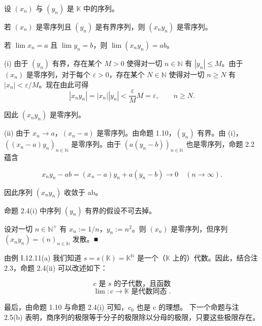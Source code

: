 \begin{proposition}

设 $ (x_{n}) $ 与 $ (y_{n}) $ 是 $ \mathbb{K} $ 中的序列。

\begin{subitems}
\item

若 $ (x_{n}) $ 是零序列且 $ (y_{n}) $ 是有界序列，则 $ (x_{n}y_{n}) $ 是零序列。

\item

若 $ \lim x_{n}=a $ 且 $ \lim y_{n}=b $，则 $ \lim(x_{n}y_{n})=ab $。

\proofhead
(i) 由于 $(y_n)$ 有界，存在某个 $M > 0$ 使得对一切 $n \in \mathbb{N}$ 有 $|y_n| \leq M$。由于 $(x_n)$ 是零序列，对于每个 $\varepsilon > 0$，存在某个 $N \in \mathbb{N}$ 使得对一切 $n \geq N$ 有 $|x_n| < \varepsilon/M$。现在由此可得
\[
|x_{n}y_{n}|=|x_{n}||y_{n}|<\frac{\varepsilon}{M}M=\varepsilon,\qquad n\geq N.
\]

因此 $(x_{n}y_{n})$ 是零序列。

\end{subitems}

(ii) 由于 $ x_n \to a $，$ (x_n - a) $ 是零序列。由命题 1.10，$ (y_n) $ 有界。由 (i)，$ ((x_n - a)y_n)_{n \in \mathbb{N}} $ 是零序列。由于 $ (a(y_n - b))_{n \in \mathbb{N}} $ 也是零序列，命题 2.2 蕴含

\[
x_{n}y_{n}-a b=(x_{n}-a)y_{n}+a(y_{n}-b)\to0\quad(n\to\infty).
\]

因此序列 $ (x_{n}y_{n}) $ 收敛于 ab。

\end{proposition}

\begin{remark}

\begin{items}
\item

命题 2.4(i) 中序列 $ (y_{n}) $ 有界的假设不可去掉。

\proofhead
设对一切 $ n \in \mathbb{N}^\times $ 有 $ x_n := 1/n $，$ y_n := n^2 $。则 $ (x_n) $ 是零序列，但序列 $ (x_ny_n) = (n)_{n \in \mathbb{N}} $ 发散。■
\item

由例 I.12.11(a) 我们知道 $ s = s(\mathbb{K}) = \mathbb{K}^{\mathbb{N}} $ 是一个（$ \mathbb{K} $ 上的）代数。因此，结合注 2.3，命题 2.4(ii) 可以改述如下：

\[
c\text{ 是 }s\text{ 的子代数，且函数}
\]
\[
\lim:c\to\mathbb{K}\text{ 是代数同态}\;.
\]

最后，由命题 1.10 与命题 2.4(i) 可知，$ c_{0} $ 也是 c 的理想。
下一个命题与注 2.5(b) 表明，商序列的极限等于分子的极限除以分母的极限，只要这些极限存在。

\end{items}

\end{remark}

